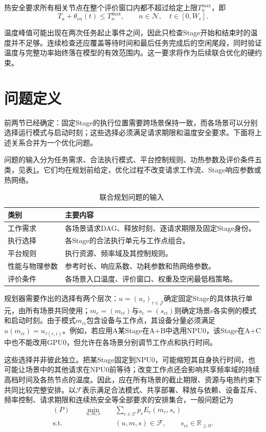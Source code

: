 热安全要求所有相关节点在整个评价窗口内都不超过给定上限$T_n^{\max}$，即
\begin{equation}
T_a+\theta_{cn}(t)\le T_n^{\max},\qquad
n\in\mathcal N,\quad t\in[0,W_c].
\label{eq:continuous-temperature-limit}
\end{equation}

温度峰值可能出现在两次任务起止事件之间，因此只检查Stage开始和结束时的温度并不足够。连续检查还应覆盖等待时间和最后任务完成后的空闲尾段，同时验证温度与完整功率始终落在模型的有效范围内。这一要求将作为后续联合优化的硬约束。

\section{问题定义}

前两节已经确定：固定Stage的执行位置需要跨场景保持一致，而各场景可以分别选择运行模式与启动时刻；这些选择必须满足请求期限和温度安全要求。下面将上述关系合并为一个优化问题。

问题的输入分为任务需求、合法执行模式、平台控制规则、功热参数及评价条件五类，见表\ref{tab:problem-inputs}。它们均在规划前给定，优化过程不改变请求工作流、Stage响应参数或热网络。
\begin{table}[htbp]
\centering
\caption{联合规划问题的输入}
\label{tab:problem-inputs}
\begin{tabular}{p{}p{}}
\toprule
类别 & 主要内容 \\
\midrule
工作需求 & 各场景请求DAG、释放时刻、逐请求期限及固定Stage身份。\\
执行选择 & 各Stage的合法执行单元与工作点组合。\\
平台规则 & 执行资源、频率域及其控制规则。\\
性能与物理参数 & 参考时长、响应系数、功耗参数和热网络参数。\\
评价条件 & 各场景入口温度、评价窗口、权重及空闲最低档策略。\\
\bottomrule
\end{tabular}
\end{table}

规划器需要作出的选择有两个层次：$u=(u_\tau)_{\tau\in\mathcal J}$确定固定Stage的具体执行单元，由所有场景共同使用；$m_c=(m_{ci})$与$s_c=(s_{ci})$则确定场景$c$各实例的模式和启动时刻。由于模式$m_{ci}$包含设备与工作点，其设备分量必须满足$u(m_{ci})=u_{\tau(c,i)}$。例如，若应用A某Stage在A+B中选用NPU0，该Stage在A+C中也不能改用GPU0，但允许在各场景分别调节工作点和执行时间。

这些选择并非彼此独立。把某Stage固定到NPU0，可能缩短其自身执行时间，也可能让场景中的其他请求在NPU0前等待；改变工作点还会影响共享频率域的持续高档时间及各热节点的温度。因此，应在所有场景的截止期限、资源与电热约束下共同比较完整安排。以$\mathcal F$表示满足合法模式、共享部署、释放与依赖、设备互斥、频率控制、请求期限和连续热安全等全部要求的安排集合，一般问题记为
\begin{equation}
\begin{aligned}
(P)\qquad \min_{u,m,s}\quad &\sum_{c\in\mathcal C}p_cE_c(m_c,s_c)\\
\mathrm{s.t.}\quad &(u,m,s)\in\mathcal F,\qquad
s_{ci}\in\mathbb R_{\ge0}.
\end{aligned}
\label{eq:general-problem}
\end{equation}

